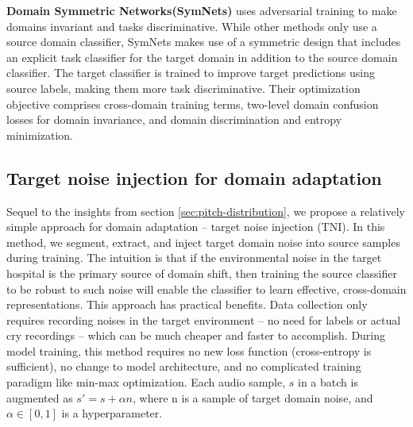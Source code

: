 \documentclass{article}
\begin{document}
\noindent \textbf{Domain Symmetric Networks(SymNets)}\cite{zhang2019domainsymmetric} uses adversarial training to make domains invariant and tasks discriminative. While other methods only use a source domain classifier, SymNets makes use of a symmetric design that includes an explicit task classifier for the target domain in addition to the source domain classifier. The target classifier is trained to improve target predictions using source labels, making them more task discriminative. Their optimization objective comprises cross-domain training terms, two-level domain confusion losses for domain invariance, and domain discrimination and entropy minimization. 

\subsection{Target noise injection for domain adaptation}
Sequel to the insights from section \ref{sec:pitch-distribution}, we propose a relatively simple approach for domain adaptation -- target noise injection (TNI). In this method, we segment, extract, and inject target domain noise into source samples during training. The intuition is that if the environmental noise in the target hospital is the primary source of domain shift, then training the source classifier to be robust to such noise will enable the classifier to learn effective, cross-domain representations. This approach has practical benefits. Data collection only requires recording noises in the target environment -- no need for labels or actual cry recordings -- which can be much cheaper and faster to accomplish. During model training, this method requires no new loss function (cross-entropy is sufficient), no change to model architecture, and no complicated training paradigm like min-max optimization. Each audio sample, $s$ in a batch is augmented as $s' = s + \alpha n$, where n is a sample of target domain noise, and $\alpha \in [0, 1]$ is a hyperparameter.
\end{document}
